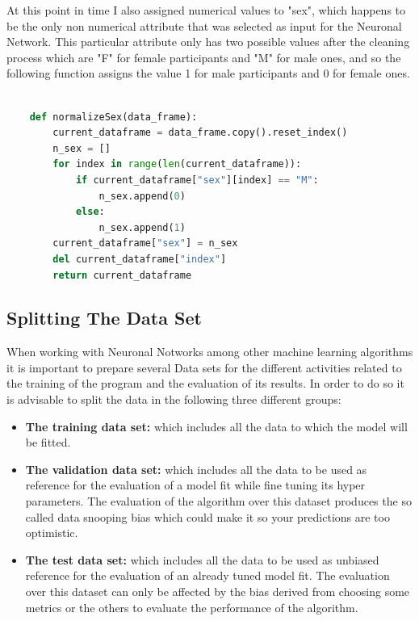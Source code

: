 \documentclass[12pt, a4paper]{article}
\begin{document}
	At this point in time I also assigned numerical values to "sex", which happens to be the only non numerical attribute  that was selected as input for the Neuronal Network. This particular attribute only has two possible values after the cleaning process which are "F" for female participants and "M" for male ones, and so the following function assigns the value 1 for male participants and 0 for female ones.
	
	\vspace{5mm}
	
	\begin{lstlisting}[language=Python]
		
	def normalizeSex(data_frame):
		current_dataframe = data_frame.copy().reset_index()
		n_sex = []
		for index in range(len(current_dataframe)):
			if current_dataframe["sex"][index] == "M":
				n_sex.append(0)
			else:
				n_sex.append(1)
		current_dataframe["sex"] = n_sex
		del current_dataframe["index"]
		return current_dataframe
	\end{lstlisting}
	
	\clearpage
	
	\subsection{Splitting The Data Set}
	
	When working with Neuronal Notworks among other machine learning algorithms it is important to prepare several Data sets for the different activities related to the training of the program and the evaluation of its results. In order to do so it is advisable to split the data in the following three different groups:\cite{dateTestsDefs}
	
	\begin{itemize}
		
		\item \textbf{The training data set:} which includes all the data to which the model will be fitted.
		
		\item \textbf{The validation data set:} which includes all the data to be used as reference for the evaluation of a model fit while fine tuning its hyper parameters. The evaluation of the algorithm over this dataset produces the so called data snooping bias which could make it so your predictions are too optimistic.
		
		\item \textbf{The test data set:} which includes all the data to be used as unbiased reference for the evaluation of an already tuned model fit. The evaluation over this dataset can only be affected by the bias derived from choosing some metrics or the others to evaluate the performance of the algorithm.
		
	\end{itemize}
\end{document}
